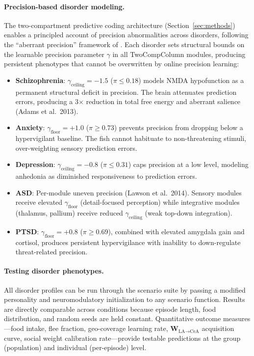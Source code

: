 \documentclass[12pt]{article}
\begin{document}
\paragraph{Precision-based disorder modeling.}
The two-compartment predictive coding architecture (Section~\ref{sec:methods})
enables a principled account of precision abnormalities across disorders,
following the ``aberrant precision'' framework of \citet{adams2013}.
Each disorder sets structural bounds on the learnable precision parameter
$\gamma$ in all TwoCompColumn modules, producing persistent phenotypes
that cannot be overwritten by online precision learning:
\begin{itemize}
  \item \textbf{Schizophrenia}: $\gamma_\text{ceiling} = -1.5$
    ($\pi \leq 0.18$) models NMDA hypofunction as a permanent
    structural deficit in precision. The brain attenuates prediction
    errors, producing a 3$\times$ reduction in total free energy
    and aberrant salience (Adams et al.\ 2013).
  \item \textbf{Anxiety}: $\gamma_\text{floor} = +1.0$
    ($\pi \geq 0.73$) prevents precision from dropping below a
    hypervigilant baseline. The fish cannot habituate to
    non-threatening stimuli, over-weighting sensory prediction
    errors.
  \item \textbf{Depression}: $\gamma_\text{ceiling} = -0.8$
    ($\pi \leq 0.31$) caps precision at a low level, modeling
    anhedonia as diminished responsiveness to prediction errors.
  \item \textbf{ASD}: Per-module uneven precision (Lawson et al.\
    2014). Sensory modules receive elevated $\gamma_\text{floor}$
    (detail-focused perception) while integrative modules
    (thalamus, pallium) receive reduced $\gamma_\text{ceiling}$
    (weak top-down integration).
  \item \textbf{PTSD}: $\gamma_\text{floor} = +0.8$
    ($\pi \geq 0.69$), combined with elevated amygdala gain and
    cortisol, produces persistent hypervigilance with inability
    to down-regulate threat-related precision.
\end{itemize}

\paragraph{Testing disorder phenotypes.}
All disorder profiles can be run through the scenario suite by passing a
modified personality and neuromodulatory initialization to any scenario
function.
Results are directly comparable across conditions because episode length,
food distribution, and random seeds are held constant.
Quantitative outcome measures---food intake, flee fraction, geo-coverage
learning rate, $\mathbf{W}_{\text{LA}\to\text{CeA}}$ acquisition curve, social weight
calibration rate---provide testable predictions at the group (population)
and individual (per-episode) level.
\end{document}
